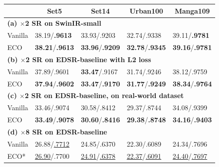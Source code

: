 \documentclass[letterpaper]{article} %
\begin{document}
\begin{table}[h]
\setlength\tabcolsep{4.0pt}
\footnotesize
\begin{tabular}{l|l|l|l|l}
\hline
\multicolumn{1}{c}{} & \multicolumn{1}{|c}{Set5} & \multicolumn{1}{|c}{Set14} & \multicolumn{1}{|c}{Urban100} & \multicolumn{1}{|c}{Manga109} \\
\hline
\hline
%
\multicolumn{5}{l}{\textbf{(a) $\times$2 SR on SwinIR-small}}\\
\hline
Vanilla             & 38.19/\textbf{.9613}             & 33.93/.9203             & 32.74/.9338             & 39.11/\textbf{.9781}                 \\
ECO               & \textbf{38.21}/\textbf{.9613}             & \textbf{33.96}/\textbf{.9209}             & \textbf{32.78}/\textbf{.9345}             & \textbf{39.16}/\textbf{.9781}                     \\
\hline
\hline
\multicolumn{5}{l}{\textbf{(b) $\times$2 SR on EDSR-baseline with L2 loss}}\\
\hline
Vanilla             & 37.89/.9601             & \textbf{33.47}/.9167             & 31.74/.9246             & 38.12/.9759                 \\
ECO               & \textbf{37.94}/\textbf{.9602}             & \textbf{33.47}/\textbf{.9170}             & \textbf{31.77}/\textbf{.9249}             & \textbf{38.34}/\textbf{.9764}                 \\
\hline
\hline
\multicolumn{5}{l}{\textbf{(c) $\times$2 SR on EDSR-baseline, on real-world dataset}}                                                                                                                                   \\
\hline
Vanilla             & 33.46/.9074             & 30.58/.8412             & 29.37/.8744             & 34.08/.9399                  \\
ECO              & \textbf{33.49}/\textbf{.9078}             & \textbf{30.60}/\textbf{.8416}             & \textbf{29.38}/\textbf{.8748}             & \textbf{34.16}/\textbf{.9403}                 \\
\hline
\hline
\multicolumn{5}{l}{\textbf{(d) $\times$8 SR on EDSR-baseline}}\\
\hline
Vanilla               & 26.88/\underline{.7712}             & 24.85/.6370             & 22.30/.6089             & 24.34/.7696                  \\
ECO*              & \underline{26.90}/.7700                          & \underline{24.91}/\underline{.6378}             & \underline{22.37}/\underline{.6091}             & \underline{24.40}/\underline{.7697}                 \\

\end{tabular}
\end{table}
\end{document}
